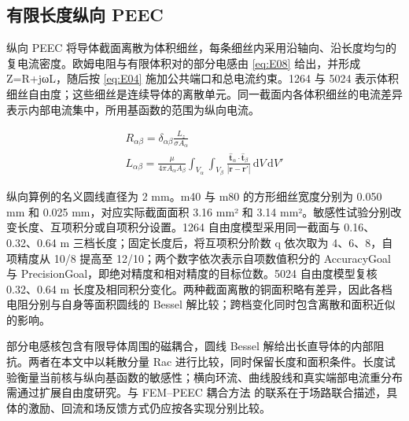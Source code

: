 \hypertarget{02.peec_method.heading}{}
\subsection{有限长度纵向 PEEC}

\hypertarget{02.peec_method.p1}{}
纵向 PEEC 将导体截面离散为体积细丝，每条细丝内采用沿轴向、沿长度均匀的复电流密度。欧姆电阻与有限体积对的部分电感由 \eqref{eq:E08} 给出，并形成 Z=R+jωL，随后按 \eqref{eq:E04} 施加公共端口和总电流约束。1264 与 5024 表示体积细丝自由度；这些细丝是连续导体的离散单元。同一截面内各体积细丝的电流差异表示内部电流集中，所用基函数的范围为纵向电流。

\hypertarget{02.equation.E08}{}
\hypertarget{E08}{}
\begin{equation}
\begin{gathered}
R_{\alpha\beta}=\delta_{\alpha\beta}\frac{L_z}{\sigma A_\alpha} \\
L_{\alpha\beta}=\frac{\mu}{4\pi A_\alpha A_\beta}\int_{V_\alpha}\int_{V_\beta}\frac{\hat{\mathbf t}_\alpha\cdot\hat{\mathbf t}_\beta}{|\mathbf r-\mathbf r'|}\,\mathrm dV\,\mathrm dV'
\end{gathered}
\tag{5}\label{eq:E08}
\end{equation}

\hypertarget{02.peec_method.p2}{}
纵向算例的名义圆线直径为 2 mm。m40 与 m80 的方形细丝宽度分别为 0.050 mm 和 0.025 mm，对应实际截面面积 3.16 mm² 和 3.14 mm²。敏感性试验分别改变长度、互项积分或自项积分设置。1264 自由度模型采用同一截面与 0.16、0.32、0.64 m 三档长度；固定长度后，将互项积分阶数 q 依次取为 4、6、8，自项精度从 10/8 提高至 12/10；两个数字依次表示自项数值积分的 AccuracyGoal 与 PrecisionGoal，即绝对精度和相对精度的目标位数。5024 自由度模型复核 0.32、0.64 m 长度及相同积分变化。两种截面离散的铜面积略有差异，因此各档电阻分别与自身等面积圆线的 Bessel 解比较；跨档变化同时包含离散和面积近似的影响。

\hypertarget{02.peec_method.p3}{}
部分电感核包含有限导体周围的磁耦合，圆线 Bessel 解给出长直导体的内部阻抗。两者在本文中以耗散分量 Rac 进行比较，同时保留长度和面积条件。长度试验衡量当前核与纵向基函数的敏感性；横向环流、曲线股线和真实端部电流重分布需通过扩展自由度研究。与 FEM–PEEC 耦合方法 \cite{P03} 的联系在于场路联合描述，具体的激励、回流和场反馈方式仍应按各实现分别比较。
